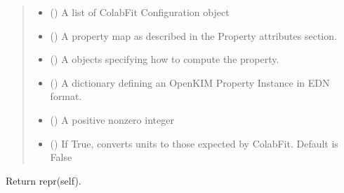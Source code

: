 \documentclass[letterpaper,10pt,english]{sphinxmanual}
\begin{document}
\begin{fulllineitems}
\begin{fulllineitems}
\begin{quote}
\begin{description}
\begin{itemize}
\item {} 
\sphinxAtStartPar
{} () \textendash{} A list of ColabFit Configuration object

\item {} 
\sphinxAtStartPar
{} () \textendash{} A property map as described in the Property attributes section.

\item {} 
\sphinxAtStartPar
{} ({\hyperref[\detokenize{property_settings:colabfit.tools.property_settings.PropertySettings}]{}}) \textendash{} A  objects specifying how to
compute the property.

\item {} 
\sphinxAtStartPar
{} () \textendash{} A dictionary defining an OpenKIM Property Instance in EDN format.

\item {} 
\sphinxAtStartPar
{} () \textendash{} A positive non\sphinxhyphen{}zero integer

\item {} 
\sphinxAtStartPar
{} () \textendash{} If True, converts units to those expected by ColabFit. Default
is False

\end{itemize}

\end{description}\end{quote}

\end{fulllineitems}


\begin{fulllineitems}
\label{\detokenize{property:colabfit.tools.property.Property.__repr__}}
\sphinxAtStartPar
Return repr(self).


\end{fulllineitems}
\end{fulllineitems}
\end{document}
